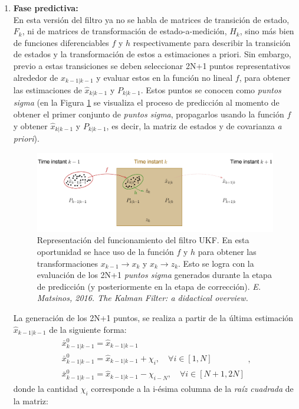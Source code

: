 \begin{enumerate}
\item \textbf{Fase predictiva:}\\
En esta versi\'on del filtro \cite{ukf} ya no se habla de matrices de transici\'on de estado, $F_k$, ni de matrices de transformaci\'on de estado-a-medici\'on, $H_k$, sino m\'as bien de funciones diferenciables $f$ y $h$ respectivamente para describir la transici\'on de estados  y la transformaci\'on de estos a estimaciones a priori. Sin embargo, previo a estas transiciones se deben seleccionar 2N+1 puntos representativos alrededor de $\hat{x}_{k-1|k-1}$ y evaluar estos en la funci\'on no lineal $f$, para obtener las estimaciones de $\hat{x}_{k|k-1}$ y $P_{k|k-1}$. Estos puntos se conocen como \textit{puntos sigma} (en la Figura \ref{fig:fukf} se visualiza el proceso de predicci\'on al momento de obtener el primer conjunto de \textit{puntos sigma}, propagarlos usando la funci\'on $f$ y obtener $\hat{x}_{k|k-1}$ y $P_{k|k-1}$, es decir, la matriz de estados y de covarianza \textit{a priori}). 

\begin{figure}[h!]
\includegraphics[scale=.5]{images/ukf}
\caption{Representaci\'on del funcionamiento del filtro UKF. En esta oportunidad se hace uso de la funci\'on $f$ y $h$ para obtener las transformaciones $x_{k-1}\rightarrow x_k$ y $x_{k}\rightarrow z_k$. Esto se logra con la evaluaci\'on de los 2N+1 \textit{puntos sigma} generados durante la etapa de predicci\'on (y posteriormente en la etapa de correcci\'on). \textit{E. Matsinos, 2016. The Kalman Filter: a didactical overview.}}
\label{fig:fukf} 
\end{figure}

La generaci\'on de los 2N+1 puntos, se realiza a partir de la \'ultima estimaci\'on $\hat{x}_{k-1|k-1}$  de la siguiente forma:
\begin{equation}
\label{eq:eq18}
\begin{gathered}
\bar{x}_{k-1| k-1}^0 = \hat{x}_{k-1|k-1}\\
\bar{x}_{k-1| k-1}^0 = \hat{x}_{k-1|k-1}+ \chi_i, \quad  \forall i \in [1, N]\\
\bar{x}_{k-1| k-1}^0 = \hat{x}_{k-1|k-1}- \chi_{i-N}, \quad  \forall i \in [N+1, 2N]
\end{gathered},
\end{equation}
donde la cantidad $\chi_i$ corresponde a la i-\'esima columna de la \textit{ra\'iz cuadrada} de la matriz:


\end{enumerate}
